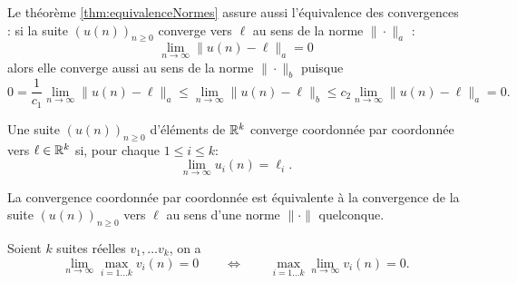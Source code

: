
\remark
Le théorème \ref{thm:equivalenceNormes} assure aussi l'équivalence des convergences : si la suite $(u(n))_{n \geq 0}$ converge vers $\ell$ au sens de la norme $\|\cdot\|_a$ :
$$
\lim_{n \to \infty} \|u(n) - \ell\|_a = 0
$$
alors elle converge aussi au sens de la norme $\|\cdot\|_b$ puisque
$$
0 = \frac1{c_1} \lim_{n \to \infty} \|u(n) - \ell\|_a
\leq \lim_{n \to \infty} \|u(n) - \ell\|_b \leq
c_2 \lim_{n \to \infty} \|u(n) - \ell\|_a = 0.
$$

\begin{definition}
  Une suite $(u(n))_{n \geq 0}$ d'éléments de $\mathbb{R}^k$ converge coordonnée par coordonnée vers $\ell \in \mathbb{R}^k$ si, pour chaque $1 \leq i \leq k$:
  $$
  \lim_{n \to \infty} u_i(n) = \ell_i.
  $$
\end{definition}

\begin{proposition} \label{prop:convergenceParCoordonnee}
  La convergence coordonnée par coordonnée est équivalente à la convergence de la suite $(u(n))_{n \geq 0}$ vers $\ell$ au sens d'une norme $\|\cdot\|$ quelconque.
\end{proposition}

\begin{lemma} \label{lem:inversionLimiteMaximum}
  Soient $k$ suites réelles $v_1, \dots v_k$, on a
  $$
  \lim_{n \to \infty} \max_{i=1 \dots k} v_i(n) = 0
  \qquad \Leftrightarrow \qquad
  \max_{i=1 \dots k} \lim_{n \to \infty} v_i(n) = 0.
  $$
\end{lemma}

